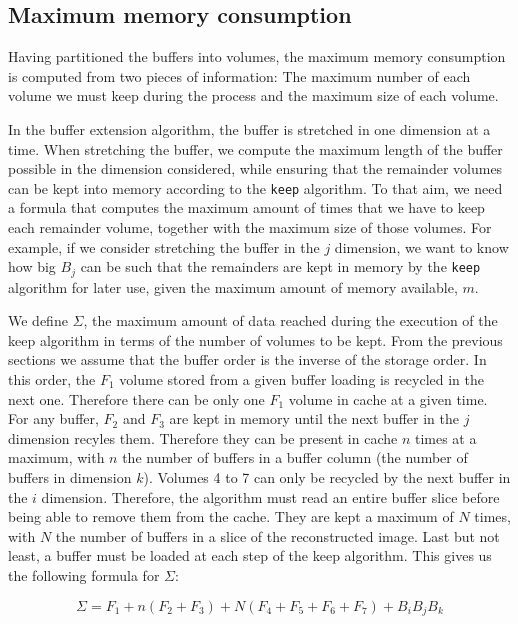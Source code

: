 \documentclass[conference]{IEEEtran}
\begin{document}
\subsection{Maximum memory consumption}

Having partitioned the buffers into volumes, the maximum memory consumption is
computed from two pieces of information: The maximum number of each volume we
must keep during the process and the maximum size of each volume.

In the buffer extension algorithm, the buffer is stretched in one dimension at a time.
When stretching the buffer, we compute the maximum length of the buffer possible
in the dimension considered, while ensuring that the remainder volumes can be
kept into memory according to the \texttt{keep} algorithm. To that aim, we need
a formula that computes the maximum amount of times that we have to keep each
remainder volume, together with the maximum size of those volumes. For example, if
we consider stretching the buffer in the $j$ dimension, we want to know how big
$B_j$ can be such that the remainders are kept in memory by the \texttt{keep}
algorithm for later use, given the maximum amount of memory available, $m$.

We define $\Sigma$, the maximum amount of data reached during the execution
of the keep algorithm in terms of the number of volumes to be kept. From the
previous sections we assume that the buffer order is the inverse of the storage order.
In this order, the $F_1$ volume stored from a given buffer loading is recycled
in the next one. Therefore there can be only one $F_1$ volume in cache at a
given time. For any buffer, $F_2$ and $F_3$ are kept in memory until the next
buffer in the $j$ dimension recyles them. Therefore they can be present in cache
$n$ times at a maximum, with $n$ the number of buffers in a buffer column (the
number of buffers in dimension $k$). Volumes 4 to 7 can only be recycled by the
next buffer in the $i$ dimension. Therefore, the algorithm must read an entire
buffer slice before being able to remove them from the cache. They are kept a
maximum of $N$ times, with $N$ the number of buffers in a slice of the
reconstructed image. Last but not least, a buffer must be loaded at each step of
the keep algorithm. This gives us the following formula for $\Sigma$:

\begin{equation} \label{eq:2}
\Sigma = F_1 + n(F_2 + F_3) + N(F_4 + F_5 + F_6 + F_7) + B_iB_jB_k
\end{equation}
\end{document}
